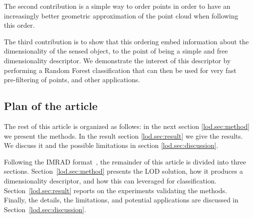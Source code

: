 	The second contribution is a simple way to order points in order to have an increasingly better geometric approximation of the point cloud when following this order.
	
	The third contribution is to show that this ordering embed information about the dimensionality of the sensed object,
	to the point of being a simple and free dimensionality descriptor.
	We demonstrate the interest of this descriptor by performing a Random Forest classification that can then be used for very fast pre-filtering of points, and other applications.
		
	
\subsection{Plan of the article}
	The rest of this article is organized as follows:
	in the next section \ref{lod.sec:method} we present the methods.  
	In the result section \ref{lod.sec:result} we give the results.
	We discuss it and the possible limitations in section \ref{lod.sec:discussion}.
	
	Following the IMRAD format~\citep{Wu2011}, the remainder of this article is divided into three sections.
	Section~\ref{lod.sec:method} presents the LOD solution, how it produces a dimensionality descriptor, and how this can leveraged for classification.  
	Section~\ref{lod.sec:result} reports on the experiments validating the methods.
	Finally, the details, the limitations, and potential applications are discussed in Section~\ref{lod.sec:discussion}.
	
